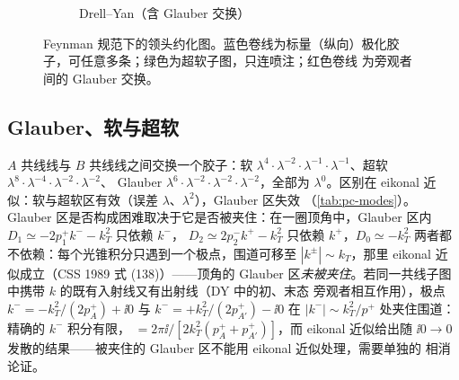 \begin{figure}[htbp]
\begin{subfigure}[b]{0.32\textwidth}
\caption{Drell--Yan（含 Glauber 交换）}\label{fig:pc-dy}
\end{subfigure}
\caption{Feynman 规范下的领头约化图。蓝色卷线为标量（纵向）极化胶子，可任意多条；绿色为超软子图，只连喷注；红色卷线
为旁观者间的 Glauber 交换。}\label{fig:pc-leading}
\end{figure}

\subsection{Glauber、软与超软}

$A$ 共线线与 $B$ 共线线之间交换一个胶子：软 $\lambda^4\cdot\lambda^{-2}\cdot\lambda^{-1}\cdot\lambda^{-1}$、超软 $\lambda^8\cdot\lambda^{-4}\cdot\lambda^{-2}\cdot\lambda^{-2}$、
Glauber $\lambda^6\cdot\lambda^{-2}\cdot\lambda^{-2}\cdot\lambda^{-2}$，全部为 $\lambda^0$。区别在 eikonal 近似：软与超软区有效（误差 $\lambda$、$\lambda^2$），Glauber 区失效
（\cref{tab:pc-modes}）。Glauber 区是否构成困难取决于它是否被夹住：在一圈顶角中，Glauber 区内 $D_1\simeq-2p_1^+k^--k_T^2$ 只依赖 $k^-$，
$D_2\simeq2p_2^-k^+-k_T^2$ 只依赖 $k^+$，$D_0\simeq-k_T^2$ 两者都不依赖：每个光锥积分只遇到一个极点，围道可移至 $|k^\pm|\sim k_T$，那里 eikonal
近似成立（CSS 1989 式 (138)）——顶角的 Glauber 区\emph{未被夹住}。若同一共线子图中携带 $k$ 的既有入射线又有出射线（DY 中的初、末态
旁观者相互作用），极点 $k^-=-k_T^2/(2p_A^+)+\ii0$ 与 $k^-=+k_T^2/(2p_{A'}^+)-\ii0$ 在 $|k^-|\sim k_T^2/p^+$ 处夹住围道：精确的 $k^-$ 积分有限，
$=2\pi\ii/[2k_T^2(p_A^++p_{A'}^+)]$，而 eikonal 近似给出随 $\ii0\to0$ 发散的结果——被夹住的 Glauber 区不能用 eikonal 近似处理，需要单独的
相消论证。


